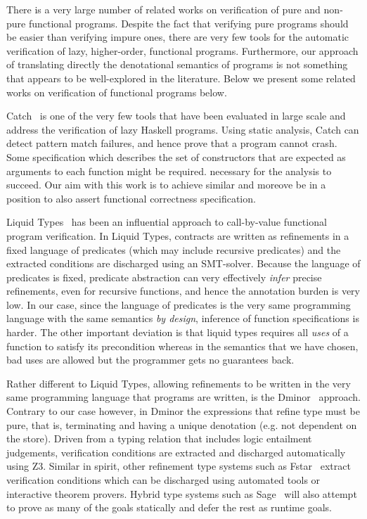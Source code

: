 
There is a very large number of related works on verification of pure and non-pure
functional programs. Despite the fact that verifying pure programs should be easier than
verifying impure ones, there are very few tools for the automatic verification of lazy, 
higher-order, functional programs. Furthermore, our approach of translating directly the 
denotational semantics of programs is not something that appears to be well-explored in 
the literature. Below we present some related works on verification of functional 
programs below.

Catch~\cite{Mitchell:2008:PBE:1411286.1411293} is one of the very few tools that 
have been evaluated in large scale and address the verification of lazy Haskell 
programs. Using static analysis, Catch can detect pattern match failures, and hence 
prove that a program cannot crash. Some specification which describes the set of 
constructors that are expected as arguments to each function might be required. 
necessary for the analysis to succeed. Our aim with this work is to achieve similar and
moreove be in a position to also assert functional correctness specification.

Liquid Types~\cite{Rondon:2008:LT:1375581.1375602} has been an influential 
approach to call-by-value functional program verification. In Liquid Types, 
contracts are written as refinements in a fixed language of predicates (which may 
include recursive predicates) and the extracted conditions are discharged using an 
SMT-solver. Because the language of predicates is fixed, predicate abstraction can 
very effectively {\em infer} precise refinements, even for recursive functions, and 
hence the annotation burden is very low. In our case, since the language of predicates
is the very same programming language with the same semantics {\em by design}, inference
of function specifications is harder. The other important deviation is that liquid types
requires all {\em uses} of a function to satisfy its precondition whereas in the semantics
that we have chosen, bad uses are allowed but the programmer gets no guarantees back.

Rather different to Liquid Types, allowing refinements to be written 
in the very same programming language that programs are written, is the 
Dminor~\cite{Bierman+:subtyping} approach. Contrary to our case however, in Dminor
the expressions that refine type must be pure, that is, terminating and having a unique
denotation (e.g. not dependent on the store). Driven from a typing relation that includes
logic entailment judgements, verification conditions are extracted and discharged automatically using Z3. Similar in spirit, other refinement type systems such 
as Fstar~\cite{fstar} extract verification conditions which can be discharged 
using automated tools 
or interactive theorem provers. Hybrid type systems such as Sage~\cite{Knowles+:sage}
will also attempt to prove as many of the goals statically and defer the rest as runtime
goals.

